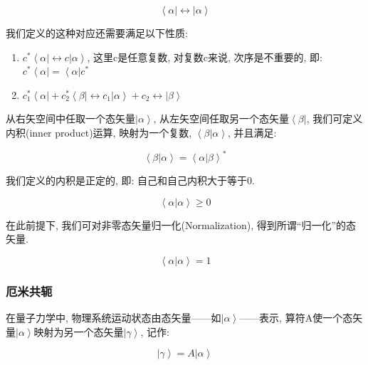\begin{equation*}
\left\langle  \alpha \right|  \leftrightarrow \left| \alpha
\right\rangle
\end{equation*}

我们定义的这种对应还需要满足以下性质:

\begin{enumerate}
  \item $c^* \left\langle  \alpha \right| \leftrightarrow c \left| \alpha
\right\rangle $, 这里c是任意复数, 对复数c来说, 次序是不重要的, 即:
$c^* \left\langle  \alpha \right| = \left\langle  \alpha \right|
c^*$
  \item $c^*_1 \left\langle  \alpha \right| + c^*_2 \left\langle  \beta \right| \leftrightarrow  c_1 \left|
  \alpha \right\rangle + c_2 \leftrightarrow \left| \beta \right\rangle $

\end{enumerate}


从右矢空间中任取一个态矢量$\left| \alpha \right\rangle$,
从左矢空间任取另一个态矢量$\left\langle \beta \right|$,
我们可定义内积(inner product)运算, 映射为一个复数, $\left\langle
\beta | \alpha \right\rangle$, 并且满足:

\begin{equation*}
\left\langle \beta | \alpha \right\rangle = \left\langle \alpha |
\beta \right\rangle^*
\end{equation*}

我们定义的内积是正定的, 即: 自己和自己内积大于等于0.

\begin{equation*}
\left\langle \alpha | \alpha \right\rangle \geq 0
\end{equation*}

在此前提下, 我们可对非零态矢量归一化(Normalization),
得到所谓``归一化''的态矢量.

\begin{equation*}
\left\langle \alpha | \alpha \right\rangle =1
\end{equation*}



\subsubsection{厄米共轭}


在量子力学中, 物理系统运动状态由态矢量——如$\left| \alpha
\right\rangle$——表示, 算符A使一个态矢量$\left| \alpha
\right\rangle$映射为另一个态矢量$\left| \gamma \right\rangle$, 记作:

\begin{equation*}
\left| \gamma \right\rangle = A \left| \alpha \right\rangle
\end{equation*}

